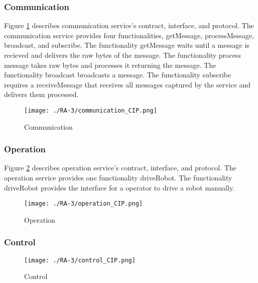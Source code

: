 \subsubsection{Communication} %
Figure \ref{fig:communication_cip} describes communication service's contract, interface, and protocol. The communication service provides four functionalities, getMessage, processMessage, broadcast, and subscribe. The functionality getMessage waits until a message is recieved and delivers the raw bytes of the message. The functionality process message takes raw bytes and processes it returning the message. The functionality broadcast broadcasts a message. The functionality subscribe requires a receiveMessage that receives all messages captured by the service and delivers them processed.
\begin{figure}[ht!]
 \centering
 \texttt{[image: ./RA-3/communication\_CIP.png]}
 \caption{Communication}
 \label{fig:communication_cip}
\end{figure}

\subsubsection{Operation} %
Figure \ref{fig:operation_cip} describes operation service's contract, interface, and protocol. The operation service provides one functionality driveRobot. The functionality driveRobot provides the interface for a operator to drive a robot manually.
\begin{figure}[ht!]
 \centering
 \texttt{[image: ./RA-3/operation\_CIP.png]}
 \caption{Operation}
 \label{fig:operation_cip}
\end{figure}

\subsubsection{Control} %
\begin{figure}[ht!]
 \centering
 \texttt{[image: ./RA-3/control\_CIP.png]}
 \caption{Control}
 \label{fig:control_cip}
\end{figure}

